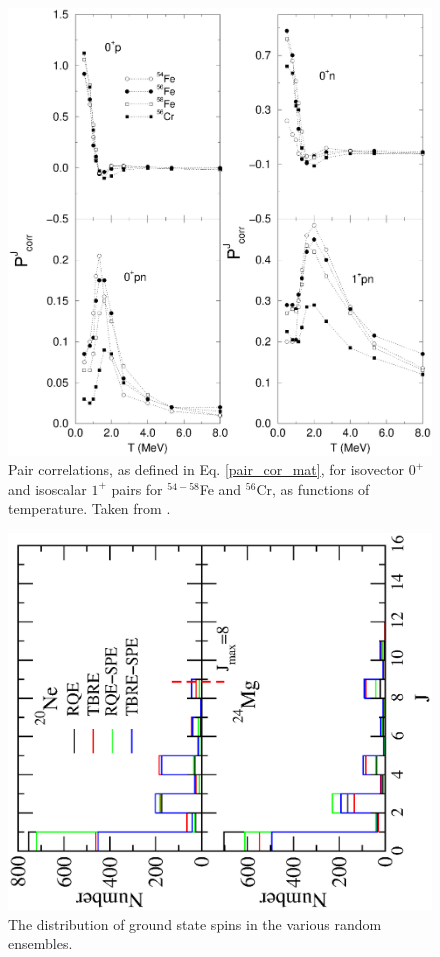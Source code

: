 \documentclass[rmp,aps,floatfix]{revtex4}
\begin{document}
\begin{figure}
\includegraphics[scale=0.5,angle=0]{dean_hjorthjensen_fig23.ps}
\caption{Pair correlations, as defined in Eq. \ref{pair_cor_mat},
for isovector $0^+$ and isoscalar $1^+$ pairs for $^{54-58}$Fe
and $^{56}$Cr, as functions of temperature. Taken from  \protect\cite{Langanke95b}.
}
\label{fig_813}
\end{figure}

\begin{figure}
\begin{center}
\includegraphics[scale=0.55,angle=270]{dean_hjorthjensen_fig24.ps}
\end{center}
\caption{The distribution of ground state spins in the various
random ensembles.}
\label{fig:j0s}
\end{figure}
\end{document}
